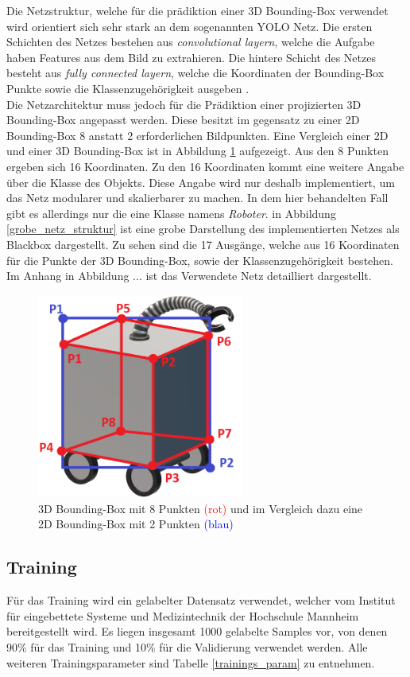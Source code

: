 Die Netzstruktur, welche für die prädiktion einer 3D Bounding-Box verwendet wird orientiert sich sehr stark an dem sogenannten YOLO Netz. Die ersten Schichten des Netzes bestehen aus \textit{convolutional layern}, welche die Aufgabe haben Features aus dem Bild zu extrahieren. Die hintere Schicht des Netzes besteht aus  \textit{fully connected layern}, welche die Koordinaten der Bounding-Box Punkte sowie die Klassenzugehörigkeit  ausgeben \cite{Redmon2016}. \\Die Netzarchitektur muss jedoch für die Prädiktion einer projizierten 3D Bounding-Box angepasst werden. Diese besitzt im gegensatz zu einer 2D Bounding-Box 8 anstatt 2 erforderlichen Bildpunkten. Eine Vergleich einer 2D und einer 3D Bounding-Box ist in Abbildung \ref{3D_Bounding_roboter} aufgezeigt. Aus den 8 Punkten ergeben sich 16 Koordinaten. Zu den 16 Koordinaten kommt eine weitere Angabe über die Klasse des Objekts. Diese Angabe wird nur deshalb implementiert, um das Netz modularer und skalierbarer zu  machen. In dem hier behandelten Fall gibt es allerdings nur die eine Klasse namens \textit{Roboter}. in Abbildung \ref{grobe_netz_struktur} ist eine grobe Darstellung des implementierten Netzes als Blackbox dargestellt. Zu sehen sind die 17 Ausgänge, welche aus 16 Koordinaten für die Punkte der 3D Bounding-Box, sowie der Klassenzugehörigkeit bestehen. Im Anhang in Abbildung ... ist das Verwendete Netz detailliert dargestellt.

\begin{figure}[!htb]
  \centering
  \includegraphics[width=6.8cm]{Abb/3d_robotter_mit_boundig_box_2d_vs_3d.PNG}
  \caption{3D Bounding-Box mit 8 Punkten \textcolor{red}{(rot)} und im Vergleich dazu eine 2D Bounding-Box mit 2 Punkten \textcolor{blue}{(blau)} }
  \label{3D_Bounding_roboter}
\end{figure} 

\newpage
\subsection{Training}
Für das Training wird ein gelabelter Datensatz verwendet, welcher vom Institut für eingebettete Systeme und Medizintechnik der Hochschule Mannheim bereitgestellt wird. Es liegen insgesamt 1000 gelabelte Samples vor, von denen 90\% für das Training und 10\% für die Validierung verwendet werden. Alle weiteren Trainingsparameter sind Tabelle \ref{trainings_param} zu entnehmen.\\

